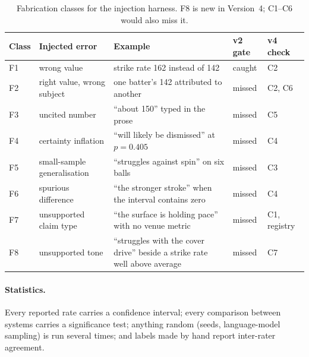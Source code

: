\documentclass[11pt,a4paper]{article}
\begin{document}
\begin{table}[htbp]
\centering
\footnotesize
\renewcommand{\arraystretch}{1.2}
\begin{tabular}{@{}>{\raggedright\arraybackslash}p{1.0cm}
                  >{\raggedright\arraybackslash}p{3.2cm}
                  >{\raggedright\arraybackslash}p{5.6cm}
                  >{\raggedright\arraybackslash}p{1.8cm}
                  >{\raggedright\arraybackslash}p{2.2cm}@{}}
\toprule
\textbf{Class} & \textbf{Injected error} & \textbf{Example} & \textbf{v2 gate} & \textbf{v4 check} \\
\midrule
F1 & wrong value & strike rate 162 instead of 142 & caught & C2 \\
F2 & right value, wrong subject & one batter's 142 attributed to another & missed & C2, C6 \\
F3 & uncited number & ``about 150'' typed in the prose & missed & C5 \\
F4 & certainty inflation & ``will likely be dismissed'' at $p = 0.405$ & missed & C4 \\
F5 & small-sample generalisation & ``struggles against spin'' on six balls & missed & C3 \\
F6 & spurious difference & ``the stronger stroke'' when the interval contains zero & missed & C4 \\
F7 & unsupported claim type & ``the surface is holding pace'' with no venue metric & missed & C1, registry \\
F8 & unsupported tone & ``struggles with the cover drive'' beside a strike rate well above average & missed & C7 \\
\bottomrule
\end{tabular}
\caption{Fabrication classes for the injection harness. F8 is new in
Version~4; C1--C6 would also miss it.}
\label{tab:fab}
\end{table}

\paragraph{Statistics.} Every reported rate carries a confidence interval; every
comparison between systems carries a significance test; anything random (seeds,
language-model sampling) is run several times; and labels made by hand report
inter-rater agreement.
\end{document}
